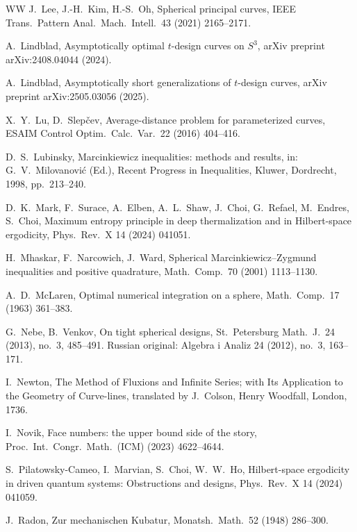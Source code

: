 \documentclass[12pt]{article}
\theoremstyle{plain}
\theoremstyle{definition}
\theoremstyle{remark}
\begin{document}
\begin{thebibliography}{WW}
J.\ Lee, J.-H.\ Kim, H.-S.\ Oh,
Spherical principal curves,
IEEE Trans.\ Pattern Anal.\ Mach.\ Intell.\ 43 (2021) 2165--2171.


A.\ Lindblad,
Asymptotically optimal $t$-design curves on $S^3$,
arXiv preprint arXiv:2408.04044 (2024).

A.\ Lindblad,
Asymptotically short generalizations of $t$-design curves,
arXiv preprint arXiv:2505.03056 (2025).

X.\ Y.\ Lu, D.\ Slep\v{c}ev,
Average-distance problem for parameterized curves,
ESAIM Control Optim.\ Calc.\ Var.\ 22 (2016) 404--416.

D.\ S.\ Lubinsky,
Marcinkiewicz inequalities: methods and results,
in: G.\ V.\ Milovanovi\'c (Ed.),
Recent Progress in Inequalities,
Kluwer, Dordrecht, 1998, pp.\ 213--240.

D.\ K.\ Mark, F.\ Surace, A.\ Elben, A.\ L.\ Shaw, J.\ Choi, G.\ Refael, M.\ Endres, S.\ Choi,
Maximum entropy principle in deep thermalization and in Hilbert-space ergodicity,
Phys.\ Rev.\ X 14 (2024) 041051.

H.\ Mhaskar, F.\ Narcowich, J.\ Ward,
Spherical Marcinkiewicz--Zygmund inequalities and positive quadrature,
Math.\ Comp.\ 70 (2001) 1113--1130.

A.\ D.\ McLaren,
Optimal numerical integration on a sphere,
Math.\ Comp.\ 17 (1963) 361--383.

G.\ Nebe, B.\ Venkov,
On tight spherical designs,
St.\ Petersburg Math.\ J.\ 24 (2013), no.\ 3, 485--491.
Russian original: Algebra i Analiz 24 (2012), no.\ 3, 163--171.

I.\ Newton,
The Method of Fluxions and Infinite Series; with Its Application to the Geometry of Curve-lines,
translated by J.\ Colson,
Henry Woodfall, London, 1736.

I.\ Novik,
Face numbers: the upper bound side of the story,
Proc.\ Int.\ Congr.\ Math.\ (ICM) (2023) 4622--4644.


S.\ Pilatowsky-Cameo, I.\ Marvian, S.\ Choi, W.\ W.\ Ho,
Hilbert-space ergodicity in driven quantum systems: Obstructions and designs,
Phys.\ Rev.\ X 14 (2024) 041059.

J.\ Radon,
Zur mechanischen Kubatur,
Monatsh.\ Math.\ 52 (1948) 286--300.


\end{thebibliography}
\end{document}
